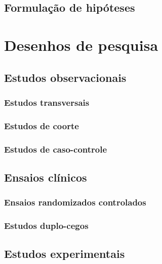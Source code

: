 \documentclass[
]{book}
\begin{document}
\section{Formulação de hipóteses}\label{formulauxe7uxe3o-de-hipuxf3teses}

\chapter{Desenhos de pesquisa}\label{desenhos-de-pesquisa}

\section{Estudos observacionais}\label{estudos-observacionais}

\subsection{Estudos transversais}\label{estudos-transversais}

\subsection{Estudos de coorte}\label{estudos-de-coorte}

\subsection{Estudos de caso-controle}\label{estudos-de-caso-controle}

\section{Ensaios clínicos}\label{ensaios-cluxednicos}

\subsection{Ensaios randomizados controlados}\label{ensaios-randomizados-controlados}

\subsection{Estudos duplo-cegos}\label{estudos-duplo-cegos}

\section{Estudos experimentais}\label{estudos-experimentais}
\end{document}
